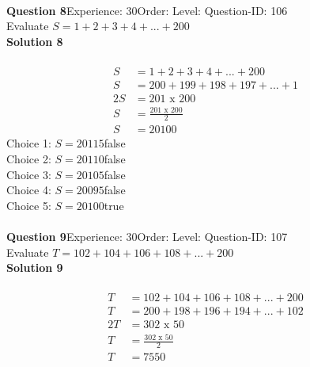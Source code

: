 \documentclass{article}
\begin{document}
\\[4pt]
\noindent\textbf{Question 8}\hspace{20pt}Experience: 30\hspace{20pt}Order: \hspace{20pt}Level: \hspace{20pt}Question-ID: 106\\[2pt]
Evaluate $S=1+2+3+4+...+200$\\[4pt]
\noindent\textbf{Solution 8}\\[2pt]
\\[-35pt]\begin{align*}
S&=1+2+3+4+...+200\\[2pt]
S&=200+199+198+197+...+1\\[2pt]
2S&=201\,\,\text{x}\,\,200\\[2pt]
S&=\displaystyle\frac{201\,\,\text{x}\,\,200}{2}\\[2pt]
S&=20100
\end{align*}
Choice 1: \hspace{20pt}$S=20115$\hspace{20pt}false\\
Choice 2: \hspace{20pt}$S=20110$\hspace{20pt}false\\
Choice 3: \hspace{20pt}$S=20105$\hspace{20pt}false\\
Choice 4: \hspace{20pt}$S=20095$\hspace{20pt}false\\
Choice 5: \hspace{20pt}$S=20100$\hspace{20pt}true\\
\\[4pt]
\noindent\textbf{Question 9}\hspace{20pt}Experience: 30\hspace{20pt}Order: \hspace{20pt}Level: \hspace{20pt}Question-ID: 107\\[2pt]
Evaluate $T=102+104+106+108+...+200$\\[4pt]
\noindent\textbf{Solution 9}\\[2pt]
\\[-35pt]\begin{align*}
T&=102+104+106+108+...+200\\[2pt]
T&=200+198+196+194+...+102\\[2pt]
2T&=302\,\,\text{x}\,\,50\\[2pt]
T&=\displaystyle\frac{302\,\,\text{x}\,\,50}{2}\\[2pt]
T&=7550
\end{align*}
\end{document}
